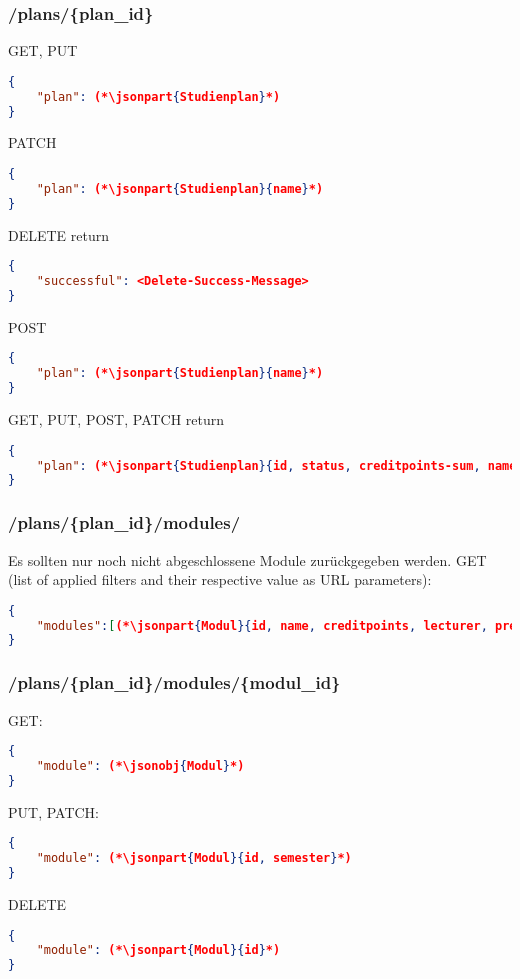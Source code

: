 \subsubsection{/plans/\{plan\_id\}}
GET, PUT
\begin{lstlisting}[language=json,firstnumber=1]
{
	"plan": (*\jsonpart{Studienplan}*)
}
\end{lstlisting}
PATCH
\begin{lstlisting}[language=json,firstnumber=1]
{
	"plan": (*\jsonpart{Studienplan}{name}*)
}
\end{lstlisting}
DELETE return
\begin{lstlisting}[language=json,firstnumber=1]
{
	"successful": <Delete-Success-Message>
}
\end{lstlisting}
POST
\begin{lstlisting}[language=json,firstnumber=1]
{
	"plan": (*\jsonpart{Studienplan}{name}*)
}
\end{lstlisting}
GET, PUT, POST, PATCH return
\begin{lstlisting}[language=json,firstnumber=1]
{
	"plan": (*\jsonpart{Studienplan}{id, status, creditpoints-sum, name}*)
}
\end{lstlisting}

\subsubsection{/plans/\{plan\_id\}/modules/}
Es sollten nur noch nicht abgeschlossene  Module zurückgegeben werden.\linebreak
GET (list of applied filters and their respective value as URL parameters):
\begin{lstlisting}[language=json,firstnumber=1]
{
	"modules":[(*\jsonpart{Modul}{id, name, creditpoints, lecturer, preference}*), ...]
}	
\end{lstlisting}

\subsubsection{/plans/\{plan\_id\}/modules/\{modul\_id\}}
GET:
\begin{lstlisting}[language=json,firstnumber=1]
{
	"module": (*\jsonobj{Modul}*)
}
\end{lstlisting}
PUT, PATCH:
\begin{lstlisting}[language=json,firstnumber=1]
{
	"module": (*\jsonpart{Modul}{id, semester}*)
}
\end{lstlisting}
DELETE
\begin{lstlisting}[language=json,firstnumber=1]
{
	"module": (*\jsonpart{Modul}{id}*)
}
\end{lstlisting}

